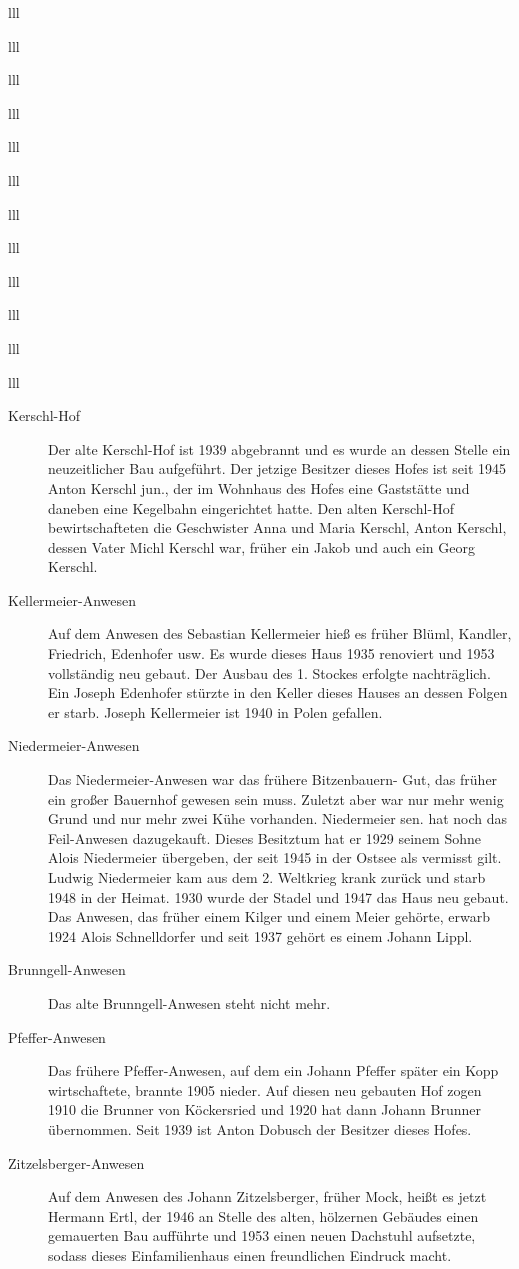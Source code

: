 \documentclass[12pt,a4pager]{book}
\begin{document}
\begin{tabuluar}{lll}
\begin{tabuluar}{lll}
\begin{tabuluar}{lll}
\begin{tabuluar}{lll}
\begin{tabuluar}{lll}
\begin{tabuluar}{lll}
\begin{tabuluar}{lll}
\begin{tabuluar}{lll}
\begin{tabuluar}{lll}
\begin{tabuluar}{lll}
\begin{tabuluar}{lll}
\begin{tabuluar}{lll}
\begin{description}
\item[Kerschl-Hof] Der alte Kerschl-Hof ist 1939 abgebrannt und es wurde an
dessen Stelle ein neuzeitlicher Bau aufgeführt. Der jetzige Besitzer dieses
Hofes ist seit 1945 Anton Kerschl jun., der im Wohnhaus des Hofes eine
Gaststätte und daneben eine Kegelbahn eingerichtet hatte. Den alten Kerschl-Hof
bewirtschafteten die Geschwister Anna und Maria Kerschl, Anton Kerschl, dessen
Vater Michl Kerschl war, früher ein Jakob und auch ein Georg Kerschl.

\item[Kellermeier-Anwesen] Auf dem Anwesen des Sebastian Kellermeier hieß es
früher Blüml, Kandler, Friedrich, Edenhofer usw. Es wurde dieses Haus 1935
renoviert und 1953 vollständig neu gebaut. Der Ausbau des 1. Stockes erfolgte
nachträglich. Ein Joseph Edenhofer stürzte in den Keller dieses Hauses an dessen
Folgen er starb. Joseph Kellermeier ist 1940 in Polen gefallen.

\item[Niedermeier-Anwesen] Das Niedermeier-Anwesen war das frühere Bitzenbauern-
Gut, das früher ein großer Bauernhof gewesen sein muss. Zuletzt aber war nur
mehr wenig Grund und nur mehr zwei Kühe vorhanden. Niedermeier sen. hat noch das
Feil-Anwesen dazugekauft. Dieses Besitztum hat er 1929 seinem Sohne Alois
Niedermeier übergeben, der seit 1945 in der Ostsee als vermisst gilt. Ludwig
Niedermeier kam aus dem 2. Weltkrieg krank zurück und starb 1948 in der Heimat.
1930 wurde der Stadel und 1947 das Haus neu gebaut. Das Anwesen, das früher
einem Kilger und einem Meier gehörte, erwarb 1924 Alois Schnelldorfer und seit
1937 gehört es einem Johann Lippl.

\item[Brunngell-Anwesen] Das alte Brunngell-Anwesen steht nicht mehr.

\item[Pfeffer-Anwesen] Das frühere Pfeffer-Anwesen, auf dem ein Johann Pfeffer
später ein Kopp wirtschaftete, brannte 1905 nieder. Auf diesen neu gebauten Hof
zogen 1910 die Brunner von Köckersried und 1920 hat dann Johann Brunner
übernommen. Seit 1939 ist Anton Dobusch der Besitzer dieses Hofes.

\item[Zitzelsberger-Anwesen] Auf dem Anwesen des Johann Zitzelsberger, früher
Mock, heißt es jetzt Hermann Ertl, der 1946 an Stelle des alten, hölzernen
Gebäudes einen gemauerten Bau aufführte und 1953 einen neuen Dachstuhl
aufsetzte, sodass dieses Einfamilienhaus einen freundlichen Eindruck macht.


\end{description}
\end{tabuluar}
\end{tabuluar}
\end{tabuluar}
\end{tabuluar}
\end{tabuluar}
\end{tabuluar}
\end{tabuluar}
\end{tabuluar}
\end{tabuluar}
\end{tabuluar}
\end{tabuluar}
\end{tabuluar}
\end{document}
